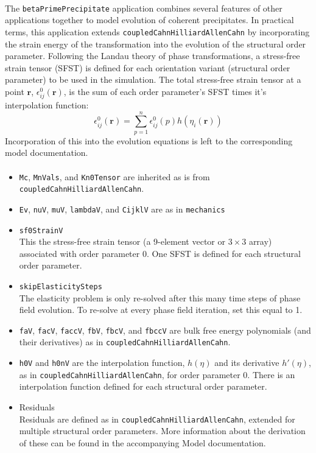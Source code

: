 \documentclass[11pt]{article} %
\begin{document}
\paragraph{}
The \texttt{betaPrimePrecipitate} application combines several features of other applications together to model evolution of coherent precipitates.  In practical terms, this application extends \texttt{coupledCahnHilliardAllenCahn} by incorporating the strain energy of the transformation into the evolution of the structural order parameter.  Following the Landau theory of phase transformations, a stress-free strain tensor (SFST) is defined for each orientation variant (structural order parameter) to be used in the simulation.  The total stress-free strain tensor at a point $\mathbf{r}$, $\epsilon^0_{ij}(\mathbf{r})$, is the sum of each order parameter's SFST times it's interpolation function:
\begin{equation}
\epsilon^0_{ij}(\mathbf{r}) = \sum^n_{p=1} \epsilon^0_{ij}(p)h(\eta_i(\mathbf{r}))
\end{equation}
Incorporation of this into the evolution equations is left to the corresponding model documentation.
\paragraph{}
\begin{itemize}
\item \texttt{Mc}, \texttt{MnVals}, and \texttt{Kn0Tensor} are inherited as is from \texttt{coupledCahnHilliardAllenCahn}.
\item \texttt{Ev}, \texttt{nuV}, \texttt{muV}, \texttt{lambdaV}, and \texttt{CijklV} are as in \texttt{mechanics}
\item \texttt{sf0StrainV} \\
This the stress-free strain tensor (a 9-element vector or $3 \times 3$ array) associated with order parameter 0.  One SFST is defined for each structural order parameter.
\item \texttt{skipElasticitySteps} \\
The elasticity problem is only re-solved after this many time steps of phase field evolution.  To re-solve at every phase field iteration, set this equal to 1.
\item \texttt{faV}, \texttt{facV}, \texttt{faccV}, \texttt{fbV}, \texttt{fbcV}, and \texttt{fbccV} are bulk free energy polynomials (and their derivatives) as in \texttt{coupledCahnHilliardAllenCahn}.
\item \texttt{h0V} and \texttt{h0nV} are the interpolation function, $h(\eta)$ and its derivative $h'(\eta)$, as in \texttt{coupledCahnHilliardAllenCahn}, for order parameter 0.  There is an interpolation function defined for each structural order parameter.
\item Residuals \\
Residuals are defined as in \texttt{coupledCahnHilliardAllenCahn}, extended for multiple structural order parameters.  More information about the derivation of these can be found in the accompanying Model documentation.

\end{itemize}
\end{document}
